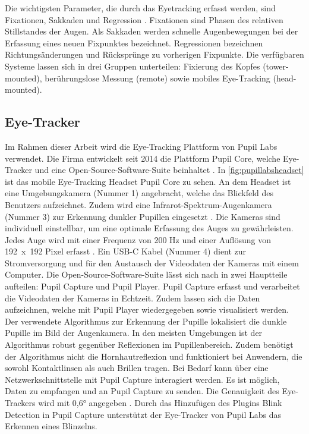 Die wichtigsten Parameter, die durch das Eyetracking erfasst werden, sind Fixationen, Sakkaden und Regression \cite{BartlPokorny.2013}. \glqq Fixationen sind Phasen des relativen Stillstandes der Augen.\grqq{} \cite{Blake.2013} Als Sakkaden werden schnelle Augenbewegungen bei der Erfassung eines neuen Fixpunktes bezeichnet. Regressionen bezeichnen Richtungsänderungen und Rücksprünge zu vorherigen Fixpunkte. Die verfügbaren Systeme lassen sich in drei Gruppen unterteilen: Fixierung des Kopfes (tower-mounted), berührungslose Messung (remote) sowie mobiles Eye-Tracking (head-mounted). \cite{BartlPokorny.2013}

\subsection{Eye-Tracker}
Im Rahmen dieser Arbeit wird die Eye-Tracking Plattform von Pupil Labs verwendet. Die Firma entwickelt seit 2014 die Plattform Pupil Core, welche Eye-Tracker und eine Open-Source-Software-Suite beinhaltet \cite{PupilLabs-About.2020}. In \autoref{fig:pupillabsheadset} ist das mobile Eye-Tracking Headset Pupil Core zu sehen. An dem Headset ist eine Umgebungskamera (Nummer 1) angebracht, welche das Blickfeld des Benutzers aufzeichnet. Zudem wird eine Infrarot-Spektrum-Augenkamera (Nummer 3) zur Erkennung dunkler Pupillen eingesetzt \cite{Kassner_2014}. Die Kameras sind individuell einstellbar, um eine optimale Erfassung des Auges zu gewährleisten. Jedes Auge wird mit einer Frequenz von 200 Hz und einer Auflösung von \mbox{192 x 192} Pixel erfasst \cite{PupilLabsSpec}. Ein USB-C Kabel (Nummer 4) dient zur Stromversorgung und für den Austausch der Videodaten der Kameras mit einem Computer. Die Open-Source-Software-Suite lässt sich nach \citeauthor{Kassner_2014} in zwei Hauptteile aufteilen: Pupil Capture und Pupil Player. Pupil Capture erfasst und verarbeitet die Videodaten der Kameras in Echtzeit. Zudem lassen sich die Daten aufzeichnen, welche mit Pupil Player wiedergegeben sowie visualisiert werden. Der verwendete Algorithmus zur Erkennung der Pupille lokalisiert die dunkle Pupille im Bild der Augenkamera. In den meisten Umgebungen ist der Algorithmus robust gegenüber Reflexionen im Pupillenbereich. Zudem benötigt der Algorithmus nicht die Hornhautreflexion und funktioniert bei Anwendern, die sowohl Kontaktlinsen als auch Brillen tragen. \cite{Kassner_2014} Bei Bedarf kann über eine Netzwerkschnittstelle mit Pupil Capture interagiert werden. Es ist möglich, Daten zu empfangen und an Pupil Capture zu senden. \cite{PupilLabsNet} Die Genauigkeit des Eye-Trackers wird mit 0,6° angegeben \cite{PupilLabsSpec}. Durch das Hinzufügen des Plugins \glqq Blink Detection\grqq{} in Pupil Capture unterstützt der Eye-Tracker von Pupil Labs das Erkennen eines Blinzelns. \cite{PupilCapture.2020}


